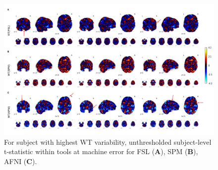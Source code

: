 \documentclass[11pt,onecolumn]{article}
\begin{document}
\begin{figure}[ht]
  \centering
  \includegraphics[width=\textwidth]{figures/5-marked.pdf}
  \caption{For subject with highest WT variability, unthresholded subject-level t-statistic
  within tools at machine error for FSL (\textbf{A}),
  SPM (\textbf{B}), AFNI (\textbf{C}).}%
  \label{fig:unthresh-worst-sbj}
\end{figure}
\end{document}
